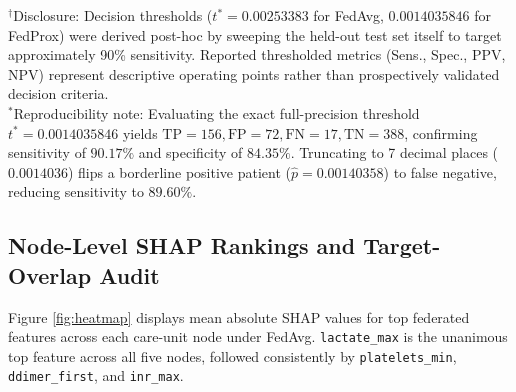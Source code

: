 \documentclass[sigconf,review,anonymous]{acmart}
\begin{document}
\begin{table}[t]
\caption{Pooled classification performance on held-out test cohort ($N = 633$)}
\label{tab:fl-performance}
\centering
\small
{}
\vspace{1mm}
\begin{minipage}{\textwidth}
\scriptsize $^\dagger$Disclosure: Decision thresholds ($t^* = 0.00253383$ for FedAvg, $0.0014035846$ for FedProx) were derived post-hoc by sweeping the held-out test set itself to target approximately 90\% sensitivity. Reported thresholded metrics (Sens., Spec., PPV, NPV) represent descriptive operating points rather than prospectively validated decision criteria.\\
$^*$Reproducibility note: Evaluating the exact full-precision threshold $t^* = 0.0014035846$ yields $\text{TP} = 156, \text{FP} = 72, \text{FN} = 17, \text{TN} = 388$, confirming sensitivity of $90.17\%$ and specificity of $84.35\%$. Truncating to 7 decimal places ($0.0014036$) flips a borderline positive patient ($\hat{p} = 0.00140358$) to false negative, reducing sensitivity to $89.60\%$.
\end{minipage}
\end{table}

\subsection{Node-Level SHAP Rankings and Target-Overlap Audit}
Figure \ref{fig:heatmap} displays mean absolute SHAP values for top federated features across each care-unit node under FedAvg. \texttt{lactate\_max} is the unanimous top feature across all five nodes, followed consistently by \texttt{platelets\_min}, \texttt{ddimer\_first}, and \texttt{inr\_max}.
\end{document}
